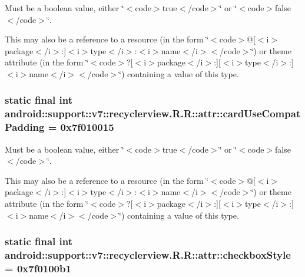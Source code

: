 Must be a boolean value, either \char`\"{}$<$code$>$true$<$/code$>$\char`\"{} or \char`\"{}$<$code$>$false$<$/code$>$\char`\"{}. 

This may also be a reference to a resource (in the form \char`\"{}$<$code$>$@\mbox{[}$<$i$>$package$<$/i$>$:\mbox{]}$<$i$>$type$<$/i$>$:$<$i$>$name$<$/i$>$$<$/code$>$\char`\"{}) or theme attribute (in the form \char`\"{}$<$code$>$?\mbox{[}$<$i$>$package$<$/i$>$:\mbox{]}\mbox{[}$<$i$>$type$<$/i$>$:\mbox{]}$<$i$>$name$<$/i$>$$<$/code$>$\char`\"{}) containing a value of this type. \hypertarget{classandroid_1_1support_1_1v7_1_1recyclerview_1_1_r_1_1attr_ce58c98c79a385be4560396228edfab5}{
\subsubsection[{cardUseCompatPadding}]{\setlength{\rightskip}{0pt plus 5cm}static final int android::support::v7::recyclerview.R.R::attr::cardUseCompatPadding = 0x7f010015}}
\label{classandroid_1_1support_1_1v7_1_1recyclerview_1_1_r_1_1attr_ce58c98c79a385be4560396228edfab5}


Must be a boolean value, either \char`\"{}$<$code$>$true$<$/code$>$\char`\"{} or \char`\"{}$<$code$>$false$<$/code$>$\char`\"{}. 

This may also be a reference to a resource (in the form \char`\"{}$<$code$>$@\mbox{[}$<$i$>$package$<$/i$>$:\mbox{]}$<$i$>$type$<$/i$>$:$<$i$>$name$<$/i$>$$<$/code$>$\char`\"{}) or theme attribute (in the form \char`\"{}$<$code$>$?\mbox{[}$<$i$>$package$<$/i$>$:\mbox{]}\mbox{[}$<$i$>$type$<$/i$>$:\mbox{]}$<$i$>$name$<$/i$>$$<$/code$>$\char`\"{}) containing a value of this type. \hypertarget{classandroid_1_1support_1_1v7_1_1recyclerview_1_1_r_1_1attr_44fe190040ba1c1e21209ce2e72d5153}{
\subsubsection[{checkboxStyle}]{\setlength{\rightskip}{0pt plus 5cm}static final int android::support::v7::recyclerview.R.R::attr::checkboxStyle = 0x7f0100b1}}
\label{classandroid_1_1support_1_1v7_1_1recyclerview_1_1_r_1_1attr_44fe190040ba1c1e21209ce2e72d5153}


